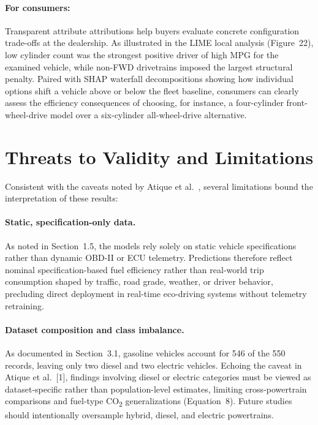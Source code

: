 \paragraph{For consumers:}
Transparent attribute attributions help buyers evaluate concrete configuration trade-offs at the dealership. As illustrated in the LIME local analysis (Figure~22), low cylinder count was the strongest positive driver of high MPG for the examined vehicle, while non-FWD drivetrains imposed the largest structural penalty. Paired with SHAP waterfall decompositions showing how individual options shift a vehicle above or below the fleet baseline, consumers can clearly assess the efficiency consequences of choosing, for instance, a four-cylinder front-wheel-drive model over a six-cylinder all-wheel-drive alternative.


\section{Threats to Validity and Limitations}

Consistent with the caveats noted by Atique et al.~\cite{atique2026explainable}, several limitations bound the interpretation of these results:

\paragraph{Static, specification-only data.}
As noted in Section~1.5, the models rely solely on static vehicle specifications rather than dynamic OBD-II or ECU telemetry. Predictions therefore reflect nominal specification-based fuel efficiency rather than real-world trip consumption shaped by traffic, road grade, weather, or driver behavior, precluding direct deployment in real-time eco-driving systems without telemetry retraining.

\paragraph{Dataset composition and class imbalance.}
As documented in Section~3.1, gasoline vehicles account for 546 of the 550 records, leaving only two diesel and two electric vehicles. Echoing the caveat in Atique et al.~[1], findings involving diesel or electric categories must be viewed as dataset-specific rather than population-level estimates, limiting cross-powertrain comparisons and fuel-type CO\textsubscript{2} generalizations (Equation~8). Future studies should intentionally oversample hybrid, diesel, and electric powertrains.

